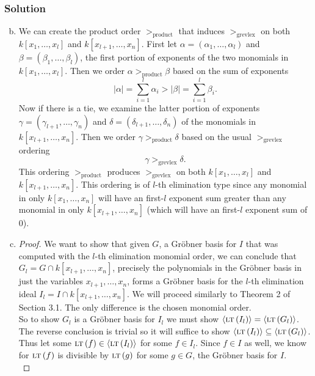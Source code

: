 \documentclass{homework}
\newcommand{\LTg}[1]{\langle\LT{#1}\rangle}
\newcommand{\LT}[1]{\textsc{lt}\left(#1\right)}
\begin{document}
    \subsubsection{Solution}
    \begin{enumerate}[(a)]
        \setcounter{enumi}{1}
        \item We can create the product order $>_{\textrm{product}}$ that induces $>_{\textrm{grevlex}}$ on both $k[x_1, \dots, x_l]$ and $k[x_{l+1}, \dots, x_n]$. First let $\alpha = (\alpha_1, \dots, \alpha_l)$ and $\beta = (\beta_1, \dots, \beta_l)$, the first portion of exponents of the two monomials in $k[x_1, \dots, x_l]$. Then we order $\alpha >_{\textrm{product}} \beta$ based on the sum of exponents
        \[|\alpha| = \sum_{i=1}^l \alpha_i > |\beta| = \sum_{i=1}^l \beta_i.\]
        Now if there is a tie, we examine the latter portion of exponents $\gamma = (\gamma_{l+1}, \dots, \gamma_n)$ and $\delta = (\delta_{l+1}, \dots, \delta_n)$ of the monomials in $k[x_{l+1}, \dots, x_n]$. Then we order $\gamma >_{\textrm{product}} \delta$ based on the usual $>_{\textrm{grevlex}}$ ordering
        \[\gamma >_{\textrm{grevlex}} \delta.\]
        This ordering $>_{\textrm{product}}$ produces $>_{\textrm{grevlex}}$ on both $k[x_1, \dots, x_l]$ and $k[x_{l+1}, \dots, x_n]$. This ordering is of $l$-th elimination type since any monomial in only $k[x_1, \dots, x_n]$ will have an first-$l$ exponent sum greater than any monomial in only $k[x_{l+1}, \dots, x_n]$ (which will have an first-$l$ exponent sum of 0).
        
        \item \begin{proof}
            We want to show that given $G$, a Gr\"obner basis for $I$ that was computed with the $l$-th elimination monomial order, we can conclude that $G_l = G \cap k[x_{l+1}, \dots, x_n]$, precisely the polynomials in the Gr\"obner basis in just the variables $x_{l+1}, \dots, x_n$, forms a Gr\"obner basis for the $l$-th elimination ideal $I_l = I \cap k[x_{l+1}, \dots, x_n]$. We will proceed similarly to Theorem 2 of Section 3.1. The only difference is the chosen monomial order. \\
            
            So to show $G_l$ is a Gr\"obner basis for $I_l$ we must show $\LTg{I_l} = \LTg{G_l}$. The reverse conclusion is trivial so it will suffice to show $\LTg{I_l} \subseteq \LTg{G_l}$. Thus let some $\LT{f} \in \LTg{I_l}$ for some $f \in I_l$. Since $f \in I$ as well, we know for $\LT f$ is divisible by $\LT g$ for some $g \in G$, the Gr\"obner basis for $I$. \\
            

\end{proof}
\end{enumerate}
\end{document}
